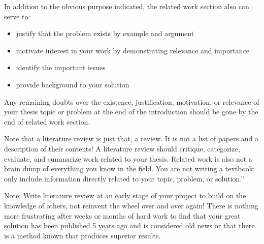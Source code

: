 In addition to the obvious purpose indicated, the related work section also can serve to:

\begin{itemize}
	\item justify that the problem exists by example and argument
	\item motivate interest in your work by demonstrating relevance and importance
	\item identify the important issues
	\item provide background to your solution
\end{itemize}

Any remaining doubts over the existence, justification, motivation, or relevance of your thesis topic or problem at the end of the introduction should be gone by the end of related work section.

Note that a literature review is just that, a review. It is not a list of papers and a description of their contents! A literature review should critique, categorize, evaluate, and summarize work related to your thesis. Related work is also not a brain dump of everything you know in the field. You are not writing a textbook; only include information directly related to your topic, problem, or solution.''

Note: Write literature review at an early stage of your project to build on the knowledge of others, not reinvent the wheel over and over again! There is nothing more frustrating after weeks or months of hard work to find that your great solution has been published 5 years ago and is considered old news or that there is a method known that produces superior results.

\cite{Robert_24}

\cite{Yassine_22}

\cite{Adam_22}
